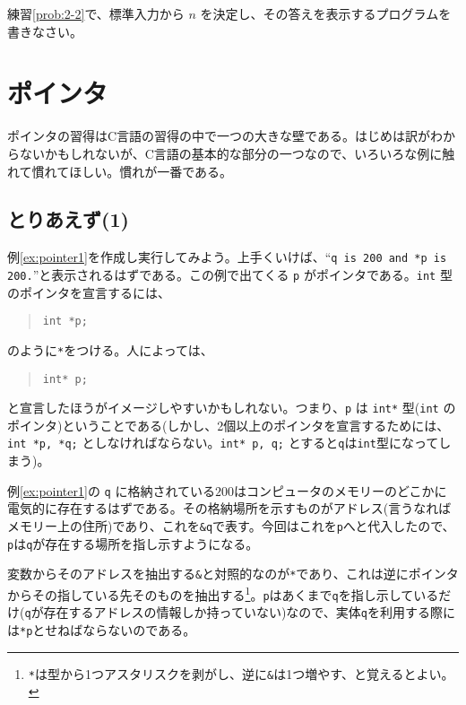 \begin{renshuu}\label{prob:4-1}
    練習\ref{prob:2-2}で、標準入力から \(n\) を決定し、その答えを表示するプログラムを書きなさい。
\end{renshuu}

\section{ポインタ}

ポインタの習得はC言語の習得の中で一つの大きな壁である。はじめは訳がわからないかもしれないが、C言語の基本的な部分の一つなので、いろいろな例に触れて慣れてほしい。慣れが一番である。

\subsection{とりあえず(1)}

例\ref{ex:pointer1}を作成し実行してみよう。上手くいけば、``\texttt{q is 200 and *p is 200.}''と表示されるはずである。この例で出てくる \texttt{p} がポインタである。\texttt{int} 型のポインタを宣言するには、
\begin{quote}
    \begin{verbatim}
int *p;
\end{verbatim}
\end{quote}
のように\texttt{*}をつける。人によっては、
\begin{quote}
    \begin{verbatim}
int* p;
\end{verbatim}
\end{quote}
と宣言したほうがイメージしやすいかもしれない。つまり、\texttt{p} は \texttt{int*} 型(\texttt{int} のポインタ)ということである(しかし、2個以上のポインタを宣言するためには、\texttt{int *p, *q;} としなければならない。\texttt{int* p, q;} とすると\texttt{q}は\texttt{int}型になってしまう)。

例\ref{ex:pointer1}の \texttt{q} に格納されている\(200\)はコンピュータのメモリーのどこかに電気的に存在するはずである。その格納場所を示すものがアドレス(言うなればメモリー上の住所)であり、これを\texttt{\&q}で表す。今回はこれを\texttt{p}へと代入したので、\texttt{p}は\texttt{q}が存在する場所を指し示すようになる。

変数からそのアドレスを抽出する\texttt{\&}と対照的なのが\texttt{*}であり、これは逆にポインタからその指している先そのものを抽出する\footnote{\texttt{*}は型から1つアスタリスクを剥がし、逆に\texttt{\&}は1つ増やす、と覚えるとよい。}。\texttt{p}はあくまで\texttt{q}を指し示しているだけ(\texttt{q}が存在するアドレスの情報しか持っていない)なので、実体\texttt{q}を利用する際には\texttt{*p}とせねばならないのである。

